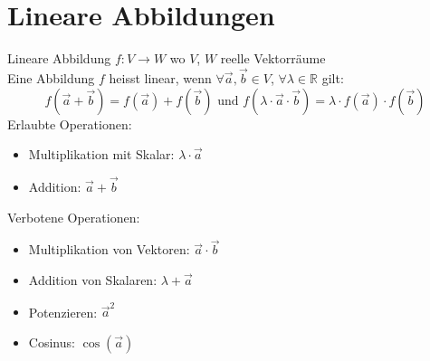 \graphicspath{{images/}}

\section{Lineare Abbildungen}


\begin{definition}{Lineare Abbildung} $f: V \rightarrow W$ wo $V$, $W$ reelle Vektorräume\\
    Eine Abbildung $f$ heisst linear, wenn $\forall \overrightarrow{a}, \overrightarrow{b} \in V$, $\forall \lambda \in \mathbb{R}$ gilt:
    $$
    f(\overrightarrow{a} + \overrightarrow{b}) = f(\overrightarrow{a}) + f(\overrightarrow{b})
    \text{ und }
    f(\lambda \cdot \overrightarrow{a} \cdot \vec{b}) = \lambda \cdot f(\overrightarrow{a}) \cdot f(\vec{b})
    $$
    Erlaubte Operationen:\\
    \begin{minipage}{0.6\linewidth}
        \begin{itemize}
            \item Multiplikation mit Skalar: $\lambda \cdot \vec{a}$
        \end{itemize}
    \end{minipage}
    \begin{minipage}{0.3\linewidth}
        \begin{itemize}
            \item Addition: $\vec{a} + \vec{b}$
        \end{itemize}
    \end{minipage}
    
    \vspace{1mm}

    Verbotene Operationen:\\
    \begin{minipage}{0.6\linewidth}
        \begin{itemize}
            \item Multiplikation von Vektoren: $\vec{a} \cdot \vec{b}$
            \item Addition von Skalaren: $\lambda + \vec{a}$
        \end{itemize}
    \end{minipage}
    \begin{minipage}{0.3\linewidth}
        \begin{itemize}
            \item Potenzieren: $\vec{a}^2$
            \item Cosinus: $\cos(\vec{a})$
        \end{itemize}
    \end{minipage}
\end{definition}

